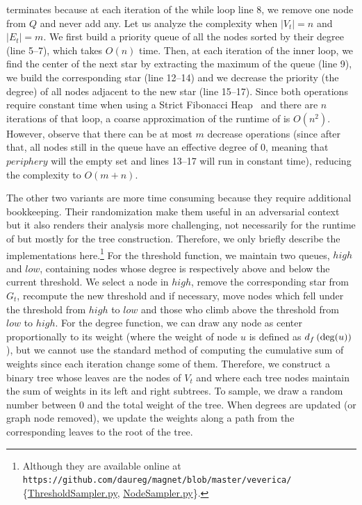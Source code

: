 \extractStar{} terminates because at each iteration of the while loop line 8, we remove one node
from $Q$ and never add any. Let us analyze the complexity when $|V_t|=n$ and $|E_t|=m$. We first
build a priority queue of all the nodes sorted by their degree (line 5--7), which takes $O(n)$ time.
Then, at each iteration of the inner loop, we find the center of the next star by extracting the
maximum of the queue (line 9), we build the corresponding star (line 12--14) and we decrease the
priority (\ie the degree) of all nodes adjacent to the new star (line 15--17).  Since both
operations require constant time when using a Strict Fibonacci Heap~\autocite{FibonacciHeaps12} and
there are $n$ iterations of that loop, a coarse approximation of the runtime of \extractStar{} is
$O(n^2)$. However, observe that there can be at most $m$ decrease operations (since after that, all
nodes still in the queue have an effective degree of $0$, meaning that $periphery$ will the empty
set and lines 13--17 will run in constant time), reducing the complexity to $O(m+n)$.

The other two variants are more time consuming because they require additional bookkeeping. Their
randomization make them useful in an adversarial context but it also renders their analysis more
challenging, not necessarily for the runtime of \extractStar{} but mostly for the tree construction.
Therefore, we only briefly describe the implementations here.\footnote{Although they are available
online at 
\nolinkurl{https://github.com/daureg/magnet/blob/master/veverica/}%
\{\href{https://github.com/daureg/magnet/blob/master/veverica/ThresholdSampler.py}%
{ThresholdSampler.py}, \href{https://github.com/daureg/magnet/blob/master/veverica/NodeSampler.py}%
{NodeSampler.py}\}.} For the threshold function, we
maintain two queues, $high$ and $low$, containing nodes whose degree is respectively above and below
the current threshold. We select a node \uar{} in $high$, remove the corresponding star from $G_t$,
recompute the new threshold and if necessary, move nodes which fell under the threshold from $high$
to $low$ and those who climb above the threshold from $low$ to $high$. For the degree function, we
can draw any node as center proportionally to its weight (where the weight of node $u$ is defined as
$d_f\left(\operatorname{deg}(u)\right)$), but we cannot use the standard method of computing the cumulative sum
of weights since each iteration change some of them. Therefore, we construct a binary tree whose
leaves are the nodes of $V_t$ and where each tree nodes maintain the sum of weights in its left and
right subtrees. To sample, we draw a random number between $0$ and the total weight of the tree.
When degrees are updated (or graph node removed), we update the weights along a path from the
corresponding leaves to the root of the tree.

